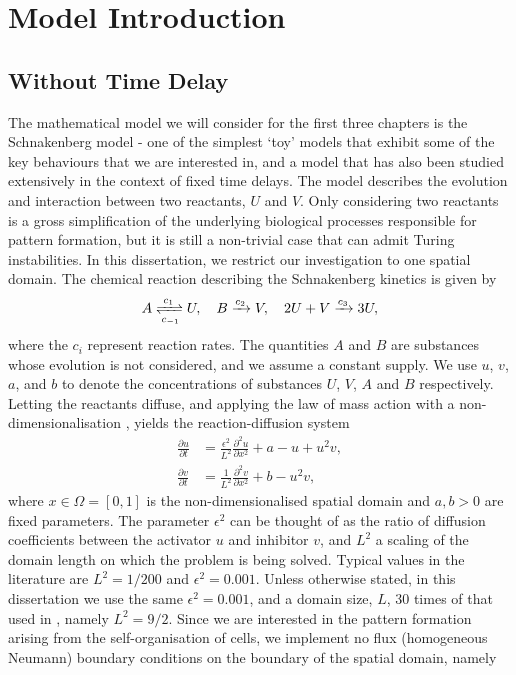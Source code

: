 \section{Model Introduction}
\subsection{Without Time Delay}
The mathematical model we will consider for the first three chapters is the Schnakenberg model \cite{schnakenberg} - one of the simplest `toy' models that exhibit some of the key behaviours that we are interested in, and a model that has also been studied extensively in the context of fixed time delays. The model describes the evolution and interaction between two reactants, $U$ and $V$. Only considering two reactants is a gross simplification of the underlying biological processes responsible for pattern formation, but it is still a non-trivial case that can admit Turing instabilities. In this dissertation, we restrict our investigation to one spatial domain. The chemical reaction describing the Schnakenberg kinetics \cite{baker} is given by
\begin{equation}\label{chem}
A\xrightleftharpoons[c_{-1}]{c_1} U,\quad B\xrightarrow{c_2} V,\quad 2U+V\xrightarrow{c_3} 3U,
\end{equation}
where the $c_i$ represent reaction rates. The quantities $A$ and $B$ are substances whose evolution is not considered, and we assume a constant supply. We use $u$, $v$, $a$, and $b$ to denote the concentrations of substances $U$, $V$, $A$ and $B$ respectively. Letting the reactants diffuse, and applying the law of mass action with a non-dimensionalisation \cite{murray}, yields the reaction-diffusion system
\begin{equation}\label{system}
    \begin{split}
    \frac{\partial u}{\partial t}&=\frac{\epsilon^2}{L^2}\frac{\partial^2 u}{\partial x^2}+a-u+u^2v,\\
    \frac{\partial v}{\partial t}&=\frac{1}{L^2}\frac{\partial^2 v}{\partial x^2}+b-u^2v,
    \end{split}
\end{equation}
where $x\in\Omega=[0,1]$ is the non-dimensionalised spatial domain and $a,b>0$ are fixed parameters. The parameter $\epsilon^2$ can be thought of as the ratio of diffusion coefficients between the activator $u$ and inhibitor $v$, and $L^2$ a scaling of the domain length on which the problem is being solved. Typical values in the literature \cite{gaffmonk} are $L^2=1/200$ and $\epsilon^2=0.001$. Unless otherwise stated, in this dissertation we use the same $\epsilon^2=0.001$, and a domain size, $L$, $30$ times of that used in \cite{gaffmonk}, namely $L^2=9/2$. Since we are interested in the pattern formation arising from the self-organisation of cells, we implement no flux (homogeneous Neumann) boundary conditions on the boundary of the spatial domain, namely
